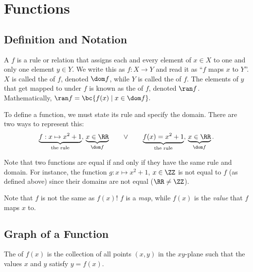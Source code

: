 \chapter{Functions}\label{chap:Functions}

\section{Definition and Notation}

\begin{definition}
    A  $f$ is a rule or relation that assigns each and every element of $x \in X$ to one and only one element $y \in Y$. We write this as $f : X \to Y$ and read it as ``$f$ maps $x$ to $Y$''. $X$ is called the  of $f$, denoted $\dom f$, while $Y$ is called the  of $f$. The elements of $y$ that get mapped to under $f$ is known as the  of $f$, denoted $\ran f$. Mathematically, $\ran f = \bc{f(x) \mid x \in \dom f}.$
\end{definition}

To define a function, we must state its rule and specify the domain. There are two ways to represent this: \[\underbrace{f : x \mapsto x^2 + 1}_{\text{the rule}}, \, \underbrace{x \in \RR}_{\dom f} \qquad \lor \qquad \underbrace{f(x) = x^2 + 1}_{\text{the rule}}, \, \underbrace{x \in \RR}_{\dom f}.\]

Note that two functions are equal if and only if they have the same rule and domain. For instance, the function $g : x \mapsto x^2 + 1$, $x \in \ZZ$ is not equal to $f$ (as defined above) since their domains are not equal ($\RR \neq \ZZ$).

Note that $f$ is not the same as $f(x)$! $f$ is a \textit{map}, while $f(x)$ is the \textit{value} that $f$ maps $x$ to.

\section{Graph of a Function}

\begin{definition}
    The  of $f(x)$ is the collection of all points $(x, y)$ in the $xy$-plane such that the values $x$ and $y$ satisfy $y = f(x)$.
\end{definition}

